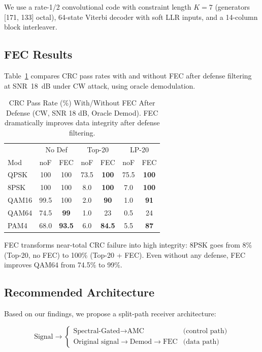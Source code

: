 \documentclass[letterpaper,twocolumn,10pt]{article}
\begin{document}
We use a rate-1/2 convolutional code with constraint length $K{=}7$
(generators [171, 133] octal), 64-state Viterbi decoder with soft
LLR inputs, and a 14-column block interleaver.

\subsection{FEC Results}

Table~\ref{tab:fec} compares CRC pass rates with and without FEC
after defense filtering at SNR~18~dB under CW attack, using oracle
demodulation.

\begin{table}[t]
\caption{CRC Pass Rate (\%) With/Without FEC After Defense (CW,
  SNR 18 dB, Oracle Demod). FEC dramatically improves data
  integrity after defense filtering.}
\label{tab:fec}
\centering
\small
\begin{tabular}{l|cc|cc|cc}
\toprule
 & \multicolumn{2}{c|}{No Def} & \multicolumn{2}{c|}{Top-20}
 & \multicolumn{2}{c}{LP-20} \\
Mod & noF & FEC & noF & FEC & noF & FEC \\
\midrule
QPSK  & 100 & 100 & 73.5 & \textbf{100} & 75.5 & \textbf{100} \\
8PSK  & 100 & 100 &  8.0 & \textbf{100} &  7.0 & \textbf{100} \\
QAM16 & 99.5 & 100 &  2.0 & \textbf{90} &  1.0 & \textbf{91} \\
QAM64 & 74.5 & \textbf{99} &  1.0 & 23 &  0.5 & 24 \\
PAM4  & 68.0 & \textbf{93.5} &  6.0 & \textbf{84.5} &  5.5 & \textbf{87} \\
\bottomrule
\end{tabular}
\end{table}

FEC transforms near-total CRC failure into high integrity:
8PSK goes from 8\% (Top-20, no FEC) to 100\% (Top-20 + FEC).
Even without any defense, FEC improves QAM64 from 74.5\% to 99\%.

\subsection{Recommended Architecture}

Based on our findings, we propose a split-path receiver architecture:

\begin{equation*}
\text{Signal} \rightarrow
\begin{cases}
\text{Spectral-Gated} \rightarrow \text{AMC} & \text{(control path)} \\
\text{Original signal} \rightarrow \text{Demod} \rightarrow \text{FEC} & \text{(data path)}
\end{cases}
\end{equation*}
\end{document}
